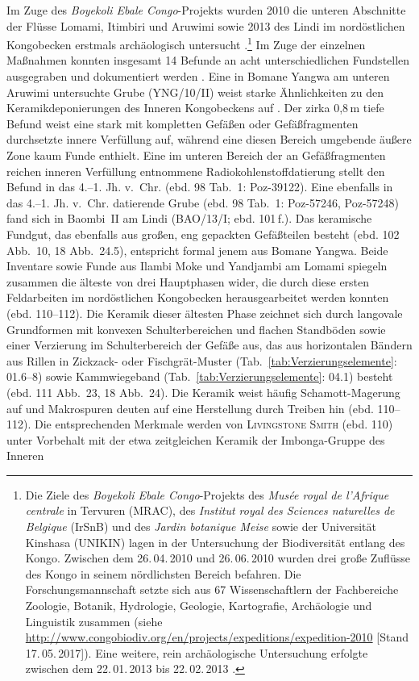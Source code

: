 Im Zuge des \textit{Boyekoli Ebale Congo}-Projekts wurden 2010 die unteren Abschnitte der Flüsse Lomami, Itimbiri und Aruwimi sowie 2013 des Lindi im nordöstlichen Kongobecken erstmals archäologisch untersucht \parencite[96]{LivingstoneSmith.2017}.\footnote{Die Ziele des \textit{Boyekoli Ebale Congo}-Projekts des \textit{Musée royal de l'Afrique centrale} in Tervuren (MRAC), des \textit{Institut royal des Sciences naturelles de Belgique} (IrSnB) und des \textit{Jardin botanique Meise} sowie der Universität Kinshasa (UNIKIN) lagen in der Untersuchung der Biodiversität entlang des Kongo. Zwischen dem 26.\,04.\,2010 und 26.\,06.\,2010 wurden drei große Zuflüsse des Kongo in seinem nördlichsten Bereich befahren. Die Forschungsmannschaft setzte sich aus 67 Wissenschaftlern der Fachbereiche Zoologie, Botanik, Hydrologie, Geologie, Kartografie, Archäologie und Linguistik zusammen (siehe \url{http://www.congobiodiv.org/en/projects/expeditions/expedition-2010} [Stand 17.\,05.\,2017]). Eine weitere, rein archäologische Untersuchung erfolgte zwischen dem 22.\,01.\,2013 bis 22.\,02.\,2013 \parencites[siehe][]{LivingstoneSmith.2011}{Cornelissen.2013}.\label{ftn:BoyekoliEbaleCongo}} Im Zuge der einzelnen Maßnahmen konnten insgesamt 14 Befunde an acht unterschiedlichen Fundstellen ausgegraben und dokumentiert werden \parencite[98 Tab.~1]{LivingstoneSmith.2017}. Eine in Bomane Yangwa am unteren Aruwimi untersuchte Grube (YNG/10/II) weist starke Ähnlichkeiten zu den Keramikdeponierungen des Inneren Kongobeckens auf \parencites[13 Abb.~2]{LivingstoneSmith.2011}[siehe][]{Wotzka.1993}. Der zirka 0,8\,m tiefe Befund weist eine stark mit kompletten Gefäßen oder Gefäßfragmenten \parencites[siehe][14 Abb.~3]{LivingstoneSmith.2011}[112 Abb.~24.4]{LivingstoneSmith.2017} durchsetzte innere Verfüllung auf, während eine diesen Bereich umgebende äußere Zone kaum Funde enthielt. Eine im unteren Bereich der an Gefäßfragmenten reichen inneren Verfüllung entnommene Radiokohlenstoffdatierung stellt den Befund in das 4.--1. Jh. v.~Chr. (ebd. 98 Tab.~1: Poz-39122). Eine ebenfalls in das 4.--1. Jh. v.~Chr. datierende Grube (ebd. 98 Tab.~1: Poz-57246, Poz-57248) fand sich in Baombi~II am Lindi (BAO/13/I; ebd. 101\,f.). Das keramische Fundgut, das ebenfalls aus großen, eng gepackten Gefäßteilen besteht (ebd. 102 Abb.~10, 18 Abb.~24.5), entspricht formal jenem aus Bomane Yangwa. Beide Inventare sowie Funde aus Ilambi Moke und Yandjambi am Lomami spiegeln zusammen die älteste von drei Hauptphasen wider, die durch diese ersten Feldarbeiten im nordöstlichen Kongobecken herausgearbeitet werden konnten (ebd. 110--112). Die Keramik dieser ältesten Phase zeichnet sich durch langovale Grundformen mit konvexen Schulterbereichen und flachen Standböden sowie einer Verzierung im Schulterbereich der Gefäße aus, das aus horizontalen Bändern aus Rillen in Zickzack- oder Fischgrät-Muster (Tab.~\ref{tab:Verzierungselemente}: 01.6--8) sowie Kammwiegeband (Tab.~\ref{tab:Verzierungselemente}: 04.1) besteht (ebd. 111 Abb.~23, 18 Abb.~24). Die Keramik weist häufig Schamott-Magerung auf und Makrospuren deuten auf eine Herstellung durch Treiben hin (ebd. 110--112). Die entsprechenden Merkmale werden von \textsc{\mbox{Livingstone} \mbox{Smith}} (ebd. 110) unter Vorbehalt mit der etwa zeitgleichen Keramik der Imbonga-Gruppe des Inneren 